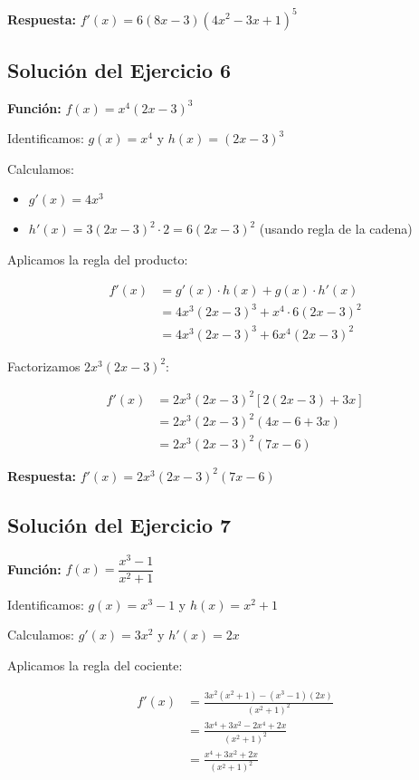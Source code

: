 \documentclass[12pt,a4paper]{article}
\begin{document}
\textbf{Respuesta:} $\boxed{f'(x) = 6(8x - 3)(4x^2 - 3x + 1)^5}$

\subsection*{Solución del Ejercicio 6}

\textbf{Función:} $f(x) = x^4(2x - 3)^3$

\bigskip

Identificamos: $g(x) = x^4$ y $h(x) = (2x - 3)^3$

Calculamos:
\begin{itemize}
	\item $g'(x) = 4x^3$
	\item $h'(x) = 3(2x - 3)^2 \cdot 2 = 6(2x - 3)^2$ (usando regla de la cadena)
\end{itemize}

Aplicamos la regla del producto:

\begin{align*}
f'(x) &= g'(x) \cdot h(x) + g(x) \cdot h'(x) \\
&= 4x^3(2x - 3)^3 + x^4 \cdot 6(2x - 3)^2 \\
&= 4x^3(2x - 3)^3 + 6x^4(2x - 3)^2
\end{align*}

Factorizamos $2x^3(2x - 3)^2$:

\begin{align*}
f'(x) &= 2x^3(2x - 3)^2[2(2x - 3) + 3x] \\
&= 2x^3(2x - 3)^2(4x - 6 + 3x) \\
&= 2x^3(2x - 3)^2(7x - 6)
\end{align*}

\textbf{Respuesta:} $\boxed{f'(x) = 2x^3(2x - 3)^2(7x - 6)}$

\subsection*{Solución del Ejercicio 7}

\textbf{Función:} $f(x) = \dfrac{x^3 - 1}{x^2 + 1}$

\bigskip

Identificamos: $g(x) = x^3 - 1$ y $h(x) = x^2 + 1$

Calculamos: $g'(x) = 3x^2$ y $h'(x) = 2x$

Aplicamos la regla del cociente:

\begin{align*}
f'(x) &= \frac{3x^2(x^2 + 1) - (x^3 - 1)(2x)}{(x^2 + 1)^2} \\
&= \frac{3x^4 + 3x^2 - 2x^4 + 2x}{(x^2 + 1)^2} \\
&= \frac{x^4 + 3x^2 + 2x}{(x^2 + 1)^2}
\end{align*}
\end{document}

